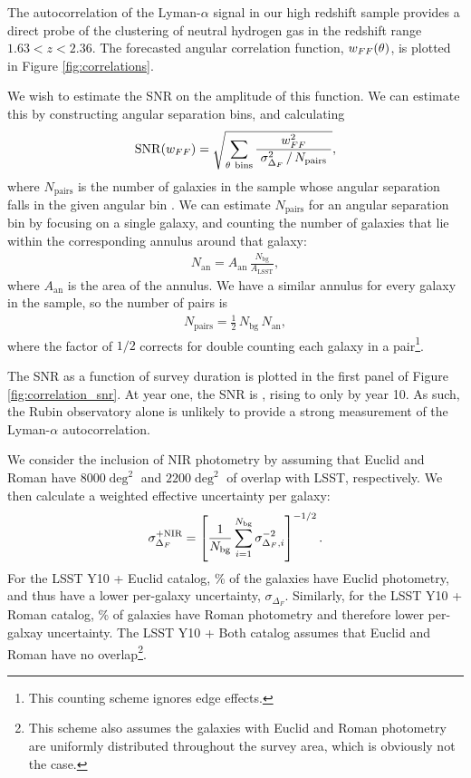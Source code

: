 \documentclass[twocolumn]{aastex631}
\newcommand{\lya}{Lyman-$\alpha$\xspace}
\begin{document}
The autocorrelation of the \lya signal in our high redshift sample provides a direct probe of the clustering of neutral hydrogen gas in the redshift range $1.63 < z < 2.36$.
The forecasted angular correlation function, $w_{\small FF}(\theta)$, is plotted in Figure \ref{fig:correlations}.

We wish to estimate the SNR on the amplitude of this function.
We can estimate this by constructing angular separation bins, and calculating
\begin{align}
    \mathrm{SNR}(w_{\small FF}) = \sqrt{
        \sum_{\theta ~ \text{bins}} \frac{w_{\small FF}^2}{~\sigma_{\Delta_F}^2 \, / \, N_\text{pairs}~}
    },
\end{align}
where $N_\text{pairs}$ is the number of galaxies in the sample whose angular separation falls in the given angular bin \citep{landy1993}.
We can estimate $N_\text{pairs}$ for an angular separation bin by focusing on a single galaxy, and counting the number of galaxies that lie within the corresponding annulus around that galaxy:
\begin{align}
    N_\text{an} = A_\text{an} \, \frac{N_\text{bg}}{A_\text{LSST}},
\end{align}
where $A_\text{an}$ is the area of the annulus.
We have a similar annulus for every galaxy in the sample, so the number of pairs is 
\begin{align}
    N_\text{pairs} = \frac{1}{2} \, N_\text{bg} \, N_\text{an},
\end{align}
where the factor of $1/2$ corrects for double counting each galaxy in a pair\footnote{This counting scheme ignores edge effects.}.

The SNR as a function of survey duration is plotted in the first panel of Figure \ref{fig:correlation_snr}.
At year one, the SNR is , rising to only  by year 10.
As such, the Rubin observatory alone is unlikely to provide a strong measurement of the \lya autocorrelation.

We consider the inclusion of NIR photometry by assuming that Euclid and Roman have $8000\deg^2$ and $2200\deg^2$ of overlap with LSST, respectively.
We then calculate a weighted effective uncertainty per galaxy:
\begin{align}
    \sigma_{\Delta_F}^{\small \text{+NIR}} = \left[ 
        \frac{1}{N_\text{bg}} \sum_{i=1}^{N_\text{bg}} \sigma_{{\small \Delta_F}, i}^{-2}
    \right]^{-1/2}.
\end{align}
For the LSST Y10 + Euclid catalog, \% of the galaxies have Euclid photometry, and thus have a lower per-galaxy uncertainty, $\sigma_{\Delta_F}$.
Similarly, for the LSST Y10 + Roman catalog, \% of galaxies have Roman photometry and therefore lower per-galxay uncertainty.
The LSST Y10 + Both catalog assumes that Euclid and Roman have no overlap\footnote{This scheme also assumes the galaxies with Euclid and Roman photometry are uniformly distributed throughout the survey area, which is obviously not the case.}.
\end{document}
